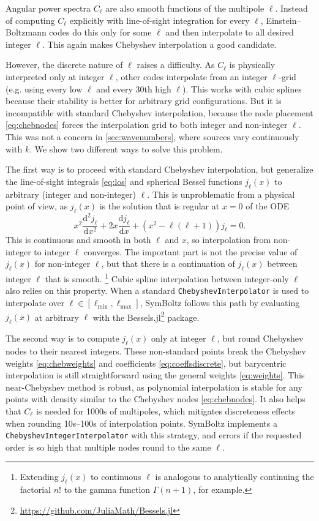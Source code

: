 \documentclass{aa}
\newcommand\ellmin{{\ell_\text{min}}}
\newcommand\ellmax{{\ell_\text{max}}}
\newcommand\EB{Einstein–Boltzmann}
\begin{document}
Angular power spectra $C_\ell$ are also smooth functions of the multipole $\ell$.
Instead of computing $C_\ell$ explicitly with line-of-sight integration for every $\ell$,
\EB{} codes do this only for some $\ell$ and then interpolate to all desired integer $\ell$.
This again makes Chebyshev interpolation a good candidate.

However, the discrete nature of $\ell$ raises a difficulty.
As $C_\ell$ is physically interpreted only at integer $\ell$,
other codes interpolate from an integer $\ell$-grid (e.g. using every low $\ell$ and every $30$th high $\ell$).
This works with cubic splines because their stability is better for arbitrary grid configurations.
But it is incompatible with standard Chebyshev interpolation,
because the node placement \eqref{eq:chebnodes} forces the interpolation grid to both integer and non-integer $\ell$.
This was not a concern in \cref{sec:wavenumbers},
where sources vary continuously with $k$.
We show two different ways to solve this problem.

The first way is to proceed with standard Chebyshev interpolation,
but generalize the line-of-sight integrals \eqref{eq:los} and spherical Bessel functions $j_\ell(x)$ to arbitrary (integer and non-integer) $\ell$.
This is unproblematic from a physical point of view, as $j_\ell(x)$ is the solution that is regular at $x = 0$ of the ODE
\begin{equation}
	x^2 \frac{\mathrm{d}^2 j_\ell}{\mathrm{d} x^2} + 2x \frac{\mathrm{d} j_\ell}{\mathrm{d} x} + \left( x^2 - \ell(\ell+1) \right) j_\ell = 0.
\label{eq:besselode}
\end{equation}
This is continuous and smooth in both $\ell$ and $x$, so interpolation from non-integer to integer $\ell$ converges.
The important part is not the precise value of $j_\ell(x)$ for non-integer $\ell$,
but that there is a continuation of $j_\ell(x)$ between integer $\ell$ that is smooth.%
\footnote{Extending $j_\ell(x)$ to continuous $\ell$ is analogous to analytically continuing the factorial $n!$ to the gamma function $\Gamma(n+1)$, for example.}
Cubic spline interpolation between integer-only $\ell$ also relies on this property.
When a standard \texttt{ChebyshevInterpolator} is used to interpolate over $\ell \in [\ellmin, \ellmax]$,
SymBoltz follows this path by evaluating $j_\ell(x)$ at arbitrary $\ell$ with the Bessels.jl\footnote{\url{https://github.com/JuliaMath/Bessels.jl}} package.

The second way is to compute $j_\ell(x)$ only at integer $\ell$,
but round Chebyshev nodes to their nearest integers.
These non-standard points break the Chebyshev weights \eqref{eq:chebweights} and coefficients \eqref{eq:coeffsdiscrete},
but barycentric interpolation is still straightforward using the general weights \eqref{eq:weights}.
This near-Chebyshev method is robust,
as polynomial interpolation is stable for any points with density similar to the Chebyshev nodes \eqref{eq:chebnodes}.
It also helps that $C_\ell$ is needed for 1000s of multipoles,
which mitigates discreteness effects when rounding 10s--100s of interpolation points.
SymBoltz implements a \texttt{ChebyshevIntegerInterpolator} with this strategy,
and errors if the requested order is so high that multiple nodes round to the same $\ell$.
\end{document}

